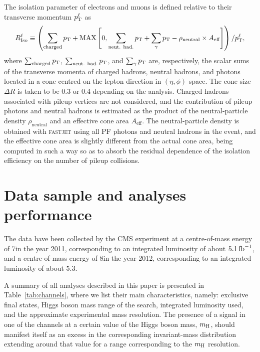 \documentclass[11pt,twoside,a4paper,cmspaper,final,collab]{cms-tdr}
\begin{document}
The isolation parameter of electrons and muons is defined relative to their transverse momentum $p_{\mathrm{T}}^{\ell}$ as
\begin{equation}
R_\text{Iso}^{\ell} \equiv \left( \sum_\text{charged}  p_{\mathrm{T}} + \mathrm{MAX}\left[ 0, \sum_\text{neut. had.}  p_{\mathrm{T}}
                                        +  \sum_{\gamma}  {p_{\mathrm{T}}} - \rho_\text{neutral} \times A_\text{eff}  \right] \right) /  p_{\mathrm{T}}^{\ell},
\label{eq:reconstruction_isolation}
\end{equation}
where $\sum_\text{charged}  p_{\mathrm{T}}$, $\sum_\text{neut. had.}  p_{\mathrm{T}}$, and $\sum_{\gamma} p_{\mathrm{T}}$ are, respectively, the scalar sums of the transverse momenta of charged hadrons, neutral hadrons, and photons located in a cone centred on the lepton direction in $(\eta, \phi)$ space.
The cone size $\Delta R$ is taken to be 0.3 or 0.4 depending on the analysis.
Charged hadrons associated with pileup vertices are not considered, and the contribution of pileup
photons and neutral hadrons is estimated as the product of the neutral-particle \PT density  $\rho_\text{neutral}$ and an effective cone area $A_\text{eff}$.
The neutral-particle \PT density is obtained with \textsc{fastjet} using all PF photons and neutral hadrons in the event, and the effective cone area is slightly different from the actual cone area,
being computed in such a way so as to absorb the residual dependence of the isolation efficiency on the number of pileup collisions.





\section{Data sample and analyses performance}\label{sec:searches}


The data have been collected by the CMS experiment at a centre-of-mass energy
of 7\TeV in the year 2011, corresponding to
an integrated  luminosity of about $5.1\mbox{\ensuremath{\,\text{fb}^\text{$-$1}}}$,  and a centre-of-mass
energy of 8\TeV in the year 2012, corresponding to
an integrated luminosity of about 5.3\fbinv.

A summary of all analyses described in this paper
is presented in Table~\ref{tab:channels}, where we list their main characteristics, namely:
exclusive final states, Higgs boson mass range of the search,
integrated luminosity used, and the approximate experimental mass resolution.
The presence of a signal in one of the channels
at a certain value of the Higgs boson mass, $m_{\mathrm{H}}$, should manifest itself as an excess
in the corresponding invariant-mass distribution extending around that value for a range corresponding to the $m_{\mathrm{H}}$ resolution.
\end{document}
